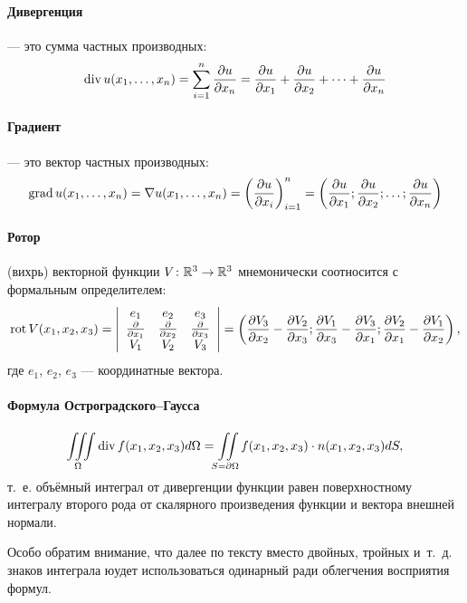 \paragraph{Дивергенция}
--- это сумма частных производных:
$$
	\operatorname{div} u(x_1, \dots, x_n) =
	\sum_{i=1}^n \frac{\partial u}{\partial x_n} =
	\frac{\partial u}{\partial x_1} + \frac{\partial u}{\partial x_2} +
	\dots + \frac{\partial u}{\partial x_n}
$$

\paragraph{Градиент}
--- это вектор частных производных:
$$
	\operatorname{grad} u(x_1, \dots, x_n) =
	\nabla u(x_1, \dots, x_n) =
	\left( \frac{\partial u}{\partial x_i}\right)_{i=1}^{n} =
	\left( \frac{\partial u}{\partial x_1} ; \frac{\partial u}{\partial x_2} ;
	\dots; \frac{\partial u}{\partial x_n}\right)
$$

\paragraph{Ротор}
(вихрь) векторной функции
$V \colon \mathbb{R}^3 \to \mathbb{R}^3$
мнемонически соотносится с формальным определителем:
$$
	\operatorname{rot} V(x_1, x_2, x_3) =
	\left|
		\begin{array}{ccc}
			e_1                           & e_2                           & e_3 \\
			\frac{\partial}{\partial x_1} & \frac{\partial}{\partial x_2} & \frac{\partial}{\partial x_3} \\
			V_1                           & V_2                           & V_3
		\end{array}
	\right|
	=
	\left(
		\frac{\partial V_3}{\partial x_2} - \frac{\partial V_2}{\partial x_3} ;
		\frac{\partial V_1}{\partial x_3} - \frac{\partial V_3}{\partial x_1} ;
		\frac{\partial V_2}{\partial x_1} - \frac{\partial V_1}{\partial x_2}
	\right),
$$
где $e_1$, $e_2$, $e_3$ --- координатные вектора.

\paragraph{Формула Остроградского--Гаусса}
$$
	\iiint\limits_{\Omega} \operatorname{div} f(x_1, x_2, x_3) d\Omega =
	\iint\limits_{S=\partial\Omega} f(x_1, x_2, x_3) \cdot n(x_1, x_2, x_3) dS,
$$
т.~е. объёмный интеграл от дивергенции функции равен
поверхностному интегралу второго рода от скалярного произведения функции и вектора внешней нормали.

Особо обратим внимание, что далее по тексту вместо двойных, тройных и~т.~д.
знаков интеграла юудет использоваться одинарный ради облегчения восприятия формул.
